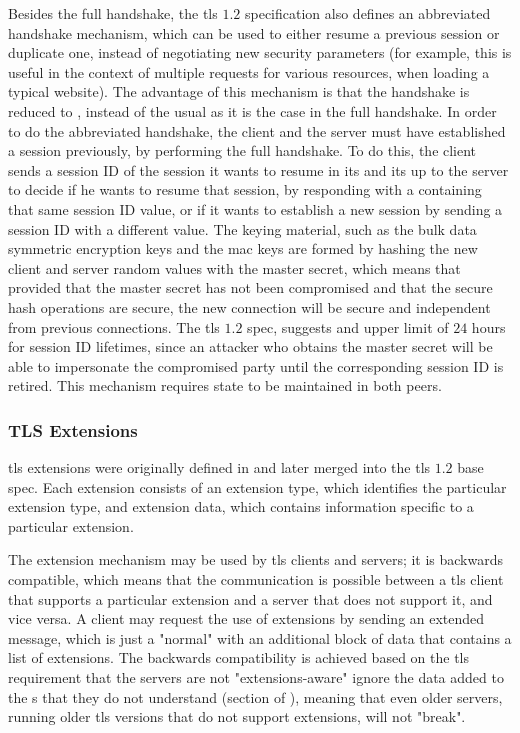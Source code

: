 \documentclass{llncs}
\begin{document}
Besides the full handshake, the \gls{tls} $1.2$ specification also defines an
abbreviated handshake mechanism, which can be used to either resume a previous session
or duplicate one, instead of negotiating new security parameters (for example, this is useful
in the context of multiple  requests for various resources, when loading
a typical website). The advantage of this mechanism is that the handshake is reduced
to , instead of the usual  as it is the case in
the full handshake. In order to do the abbreviated handshake,
the client and the server must have established a session previously, by performing
the full handshake. To do this, the client sends a session ID of the session it wants to
resume in its  and its up to the server to decide if he
wants to resume that session, by responding with a  containing
that same session ID value, or if it wants to establish a new session by
sending a session ID with a different value. The keying material, such as the bulk
data symmetric encryption keys and the \gls{mac} keys are formed by hashing the new client
and server random values with the master secret, which means
that provided that the master secret has not been compromised and that the secure
hash operations are secure, the new connection will be secure and independent
from previous connections. The \gls{tls} $1.2$ spec, suggests and upper limit
of $24$ hours for session ID lifetimes, since an attacker who obtains the master secret
will be able to impersonate the compromised party until the corresponding session
ID is retired. This mechanism requires state to be maintained in both peers.

\subsubsection{TLS Extensions}

\gls{tls} extensions were originally defined in \cite{RFC4366}
and later merged into the \gls{tls} $1.2$ base spec. Each extension consists of an
extension type, which identifies the particular extension type, and extension data,
which contains information specific to a particular extension.

The extension mechanism may be used by \gls{tls} clients and servers; it is backwards
compatible, which means that the communication is possible between a \gls{tls} client that supports a particular extension and a server that does not support it,
and vice versa. A client may request the use of extensions by sending an extended 
message, which is just a "normal"  with an additional
block of data that contains a list of extensions. The backwards compatibility is achieved based on the \gls{tls}
requirement that the servers are not "extensions-aware" ignore the data
added to the s that they do not understand (section  of \cite{RFC2246}),
meaning that even older servers, running older \gls{tls} versions that do not support extensions, will not "break".
\end{document}
